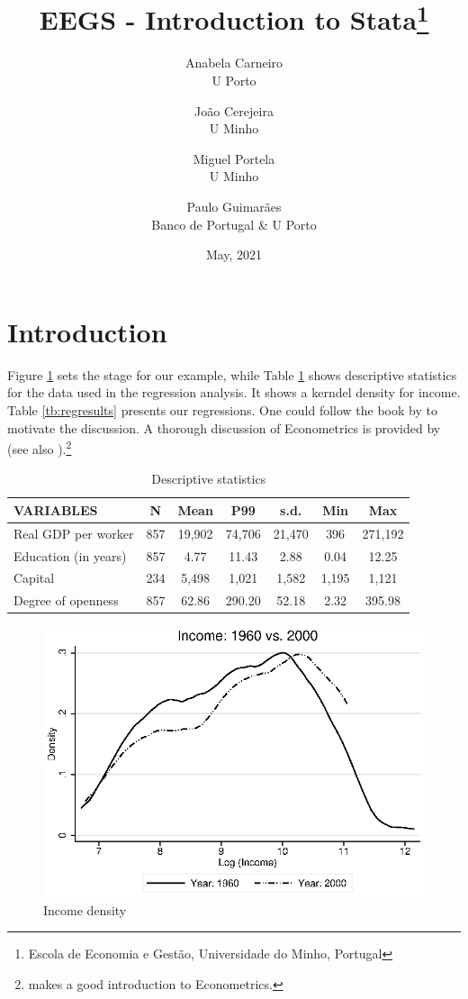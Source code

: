 \documentclass[a4paper,12pt]{article}
\title{EEGS - Introduction to Stata\thanks{Escola de Economia e Gestão, Universidade do Minho, Portugal}}
\date{May, 2021}
\author{Anabela Carneiro\\ U Porto
\and João Cerejeira \\ U Minho
\and Miguel Portela \\ U Minho 
\and Paulo Guimarães \\ Banco de Portugal \& U Porto}
\begin{document}
\maketitle

\section{Introduction}\label{sec:intro}

Figure \ref{fig:incdensity} sets the stage for our example, while Table \ref{tb:descriptives} shows descriptive statistics for the data used in the regression analysis. It shows a kerndel density for income. Table \ref{tb:regresults} presents our regressions. One could follow the book by \cite{acemoglu2016} to motivate the discussion. A thorough discussion of Econometrics is provided by \cite{greene2017} (see also \citep{verbeek2012}).\footnote{\cite{wooldridge2015introductory} makes a good introduction to Econometrics.}

\lipsum

\begin{table}[h]
\begin{center}
\caption{Descriptive statistics}\label{tb:descriptives}
\resizebox{0.9\textwidth}{!}
	{\begin{tabular}{lcccccc} \hline
VARIABLES & N & Mean & P99 & s.d. & Min & Max \\ \hline
Real GDP per worker & 857 & 19,902 & 74,706 & 21,470 & 396 & 271,192 \\
Education (in years) & 857 & 4.77 & 11.43 & 2.88 & 0.04 & 12.25 \\
Capital & 234 & 5,498 & 1,021 & 1,582 & 1,195 & 1,121 \\
Degree of openness & 857 & 62.86 & 290.20 & 52.18 & 2.32 & 395.98 \\ \hline
\end{tabular}}
\end{center}
\end{table}

\begin{figure}[ht]
	\begin{center}
		\includegraphics[scale = 0.5,trim = 0.0 0.0 0.0 0.0,clip]{income_density.eps}
		\caption{Income density}\label{fig:incdensity}
	\end{center}
\end{figure}
\end{document}
